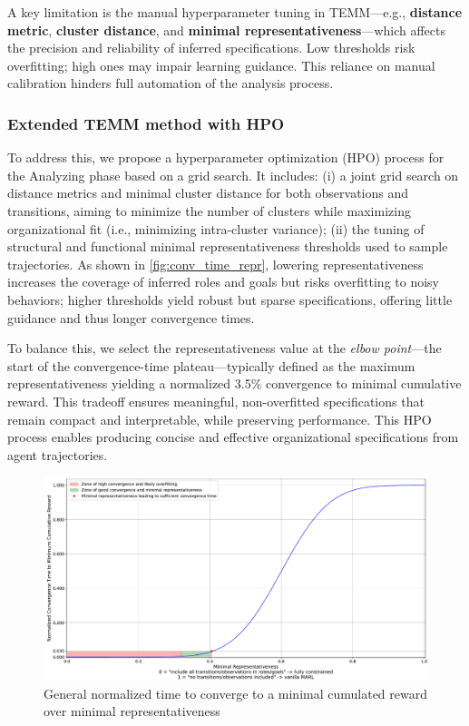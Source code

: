 \documentclass[pdflatex,sn-mathphys-num]{sn-jnl}%
\theoremstyle{thmstyleone}%
\theoremstyle{thmstyletwo}%
\theoremstyle{thmstylethree}%
\begin{document}
A key limitation is the manual hyperparameter tuning in TEMM—e.g., \textbf{distance metric}, \textbf{cluster distance}, and \textbf{minimal representativeness}—which affects the precision and reliability of inferred specifications. Low thresholds risk overfitting; high ones may impair learning guidance. This reliance on manual calibration hinders full automation of the analysis process.



\subsubsection{Extended TEMM method with HPO}
To address this, we propose a hyperparameter optimization (HPO) process for the Analyzing phase based on a grid search. It includes:
(i) a joint grid search on distance metrics and minimal cluster distance for both observations and transitions, aiming to minimize the number of clusters while maximizing organizational fit (i.e., minimizing intra-cluster variance);
(ii) the tuning of structural and functional minimal representativeness thresholds used to sample trajectories. As shown in \autoref{fig:conv_time_repr}, lowering representativeness increases the coverage of inferred roles and goals but risks overfitting to noisy behaviors; higher thresholds yield robust but sparse specifications, offering little guidance and thus longer convergence times.

To balance this, we select the representativeness value at the \textit{elbow point}—the start of the convergence-time plateau—typically defined as the maximum representativeness yielding a normalized 3.5\% convergence to minimal cumulative reward. This tradeoff ensures meaningful, non-overfitted specifications that remain compact and interpretable, while preserving performance.
%
This HPO process enables producing concise and effective organizational specifications from agent trajectories.

\medskip

\begin{figure}[h!]
    \centering
    \includegraphics[trim=0cm 0cm 0cm -0.05cm, clip, width=0.85\linewidth]{figures/convergence_time_relative_to_representativeness.pdf}
    \caption{General normalized time to converge to a minimal cumulated reward over minimal representativeness}
    \label{fig:conv_time_repr}
\end{figure}
\end{document}
